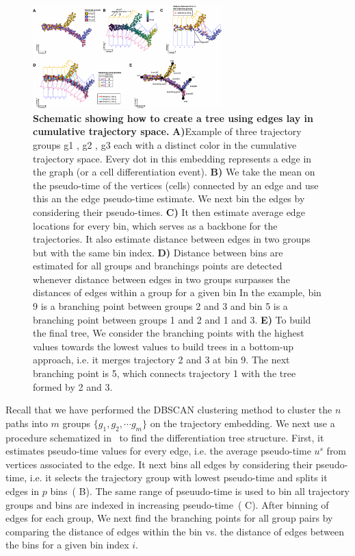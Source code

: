 \begin{figure}[!ht]
    \centering
    \includegraphics[width=0.65\textwidth]{branching/fig}
    \vspace{0.1cm}
    \caption[Schematic showing how to create a differentiation tree.]{\textbf{Schematic showing how to create a tree using edges lay in cumulative trajectory space.}  \textbf{A)}Example of three trajectory groups g1 , g2 , g3 each with a distinct color in the cumulative trajectory space. Every dot in this embedding represents a edge in the graph (or a cell differentiation event). \textbf{B)} We take the mean on the pseudo-time of the vertices (cells) connected by an edge and use this an the edge pseudo-time estimate. We next bin the edges by considering their pseudo-times. \textbf{C)} It then estimate average edge locations for every bin, which serves as a backbone for the trajectories. It also estimate distance between edges in two groups but with the same bin index. \textbf{D)} Distance between bins are estimated for all groups and branchings points are detected whenever distance between edges in two groups surpasses the distances of edges within a group for a given bin In the example, bin 9 is a branching point between groups 2 and 3 and bin 5 is a branching point between groups 1 and 2 and 1 and 3. \textbf{E)} To build the final tree, We consider the branching points with the highest values towards the lowest values to build trees in a bottom-up approach, i.e. it merges trajectory 2 and 3 at bin 9. The next branching point is 5, which connects trajectory 1 with the tree formed by 2 and 3.}
    \label{fig:branching}
\end{figure}

Recall that we have performed the DBSCAN clustering method to cluster the $n$ paths into $m$ groups $\{g_1, g_2, \cdots g_m\}$ on the trajectory embedding. We next use a procedure schematized in~ to find the differentiation tree structure. First, it estimates pseudo-time values for every edge, i.e. the average pseudo-time $u^s$ from vertices associated to the edge. It next bins all edges by considering their pseudo-time, i.e. it selects the trajectory group with lowest pseudo-time and splits it edges in $p$ bins~( B). The same range of pseuudo-time is used to bin all trajectory groups and bins are indexed in increasing pseudo-time~( C).  After binning of edges for each group, We next find the branching points for all group pairs by comparing the distance of edges within the bin vs. the distance of edges between the bins for a given bin index $i$.

